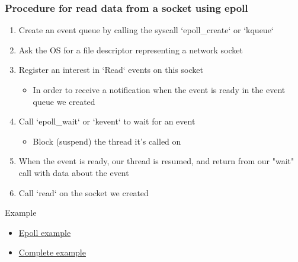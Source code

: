 \begin{frame}[fragile]
    \frametitle{Procedure for read data from a socket using epoll}
% 
% 
% 
    \begin{enumerate}
        \item Create an event queue by calling the syscall `epoll\_create` or `kqueue`
        \item Ask the OS for a file descriptor representing a network socket
        \item Register an interest in `Read` events on this socket
    	\begin{itemize}
    	    \item In order to receive a notification when the event is ready in the event queue we created
    	\end{itemize}
        \item Call `epoll\_wait` or `kevent` to wait for an event
    	\begin{itemize}
    	    \item Block (suspend) the thread it's called on
    	\end{itemize}
        \item When the event is ready, our thread is resumed, and return from our "wait" call with data about the event
        \item Call `read` on the socket we created
    \end{enumerate}
% 
{\color{red}Example}
% 
    \begin{itemize}
        \item \href{http://man7.org/linux/man-pages/man7/epoll.7.html}{Epoll example}
        \item \href{https://www.suchprogramming.com/epoll-in-3-easy-steps/}{Complete example}
    \end{itemize}

\end{frame}


